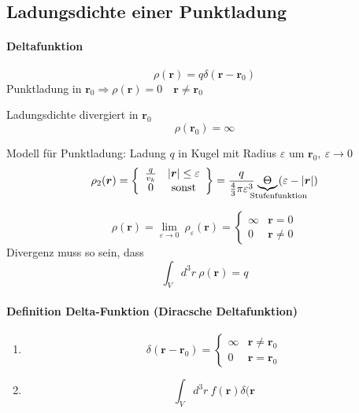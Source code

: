 \documentclass[titlepage,11pt,a4paper,ngerman]{report}
\renewcommand{\vec}[1]{\boldsymbol{#1}}
\renewcommand{\epsilon}{\varepsilon}
\begin{document}
\subsection{Ladungsdichte einer Punktladung}
\paragraph{Deltafunktion}




$$\rho (\vec{r}) = q \delta(\vec{r}-\vec{r}_0)$$
Punktladung in $\vec{r}_0 \Rightarrow \rho(\vec{r}) = 0 \quad \vec{r} \neq \vec{r}_0$

Ladungsdichte divergiert in $\vec{r}_0$
$$\rho(\vec{r}_0) = \infty$$

Modell für Punktladung:
Ladung $q$ in Kugel mit Radius $\epsilon$  um $\vec{r}_0,\ \epsilon \rightarrow 0$
$$\rho_2 (\vec{r}) = \left\{ \begin{array}{cc}
\frac{q}{v_k} & |\vec{r}| \leq \epsilon\\
0 & \textrm{sonst}	
\end{array} \right\} = \frac{q}{\frac{4}{3}\pi \epsilon^3}\underbrace{\Theta}_{\hspace{20pt}\mathclap{\textrm{Stufenfunktion}}}(\epsilon - |\vec{r}|)$$

$$\rho(\vec{r}) = \lim_{\epsilon \rightarrow 0}\ \rho_\epsilon (\vec{r}) = \left\{ \begin{array}{cc}
\infty & \vec{r} = 0\\
0 & \vec{r} \neq 0
\end{array}\right.$$
Divergenz muss so sein, dass $$ \int_V d^3r\ \rho(\vec{r}) = q$$

\paragraph{Definition Delta-Funktion (Diracsche Deltafunktion)}

\begin{enumerate}
	\item 
	$$\delta (\vec{r} - \vec{r}_0) = \left\{ \begin{array}{cc}
	\infty & \vec{r} \neq \vec{r}_0 \\
	0 & \vec{r} = \vec{r}_0
	\end{array}\right.$$
	\item 
	$$\int_V d^3 r\ f(\vec{r}) \delta(\vec{r}$$ %
\end{enumerate}
\end{document}
